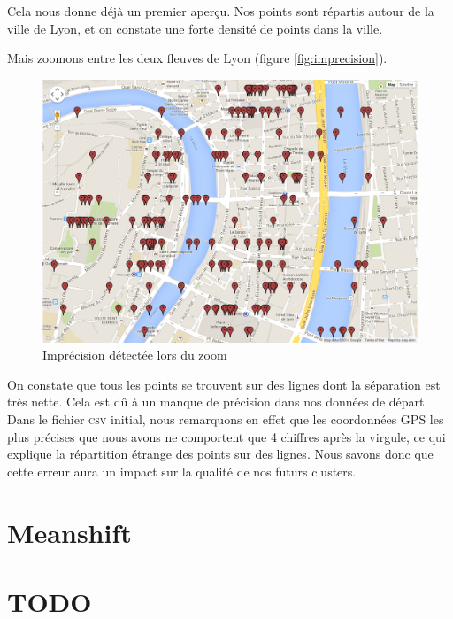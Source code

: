 Cela nous donne déjà un premier aperçu. Nos points sont répartis autour de la ville de Lyon, et on constate une forte densité de points dans la ville.

Mais zoomons entre les deux fleuves de Lyon (figure \vref{fig:imprecision}).

\begin{figure}[!h]
    \centering
    \includegraphics[width=14cm]{images/imprecision.png}
    \caption{Imprécision détectée lors du zoom}
    \label{fig:imprecision}
\end{figure}

On constate que tous les points se trouvent sur des lignes dont la séparation est très nette. Cela est dû à un manque de précision dans nos données de départ. Dans le fichier \textsc{csv} initial, nous remarquons en effet que les coordonnées GPS les plus précises que nous avons ne comportent que 4 chiffres après la virgule, ce qui explique la répartition étrange des points sur des lignes. Nous savons donc que cette erreur aura un impact sur la qualité de nos futurs clusters.


\section{Meanshift}

\section{TODO}
